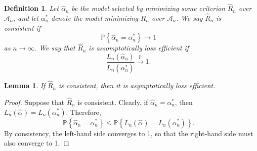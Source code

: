 \documentclass[12pt, letter paper]{article}
\newcommand{\1}{\mathmybb{1}}
\newtheorem{definition}{Definition}[section]
\newtheorem{lemma}[proposition]{Lemma}
\newcommand{\0}{\emptyset}
\newcommand{\prob}{\mathbb{P}}
\newcommand{\paren}[1]{\left(#1 \right)}
\newcommand{\set}[1]{\left\{ #1 \right\}}
\newcommand{\Acal}{\mathcal{A}_{n}}
\newcommand{\Loss}[1]{L_{n}\paren{#1}}
\newcommand{\alphahat}[1]{\hat{\alpha}^{#1}}
\begin{document}
\begin{definition}\label{def:consistency97}
    Let \(\alphahat{}_{n}\) be the model selected by minimizing some criterion \(\hat{R}_{n}\) over \(\Acal\), and let \(\alpha^{*}_{n}\) denote the model minimizing \(R_{n}\) over \(\Acal\). We say \(\hat{R}_{n}\) is {consistent} if 
    \[\prob\set{\alphahat{}_{n} = \alpha^{*}_{n}}\to 1\]
    as \(n\to\infty\). We say that \(\hat{R}_{n}\) is {assomptotically loss efficient} if 
    \[\frac{L_{n}(\alphahat{}_{n})}{L_{n}(\alpha^{*}_{n})}\xrightarrow{\prob} 1.\]
\end{definition}

\begin{lemma}\label{lemm:implication}
    If \(\hat{R}_{n}\) is consistent, then it is asymptotically loss efficient.
\end{lemma}

\begin{proof}
    Suppose that \(\hat{R}_{n}\) is consistent. Clearly, if \(\alphahat{}_{n} = \alpha^{*}_{n}\), then \(\Loss{\alphahat{}} = \Loss{\alpha^{*}_{n}}\). Therefore, 
    \[\prob\set{\alphahat{}_{n} = \alpha^{*}_{n}}\leq \prob\set{\Loss{\alphahat{}} = \Loss{\alpha^{*}_{n}}}.\]
    By consistency, the left-hand side converges to 1, so that the right-hand side must also converge to 1.
\end{proof}
\end{document}
